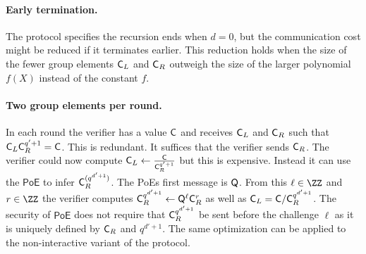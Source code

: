 \documentclass{article}
\theoremstyle{definition}
\newcommand{\benedikt}[1]{{\textcolor{red}{[Benedikt: #1]}}}
\newcommand{\benedikt}[1]{}
\begin{document}

\paragraph{Early termination.} The protocol specifies the recursion ends when $d=0$, but the communication cost might be reduced if it terminates earlier. This reduction holds when the size of the fewer group elements $\mathsf{C}_L$ and $\mathsf{C}_R$ outweigh the size of the larger polynomial $f(X)$ instead of the constant $f$.


%
\paragraph{Two group elements per round.} In each round the verifier has a value $\mathsf{C}$ and receives $\mathsf{C}_L$ and $\mathsf{C}_R$ such that $\mathsf{C}_L\mathsf{C}_R^{q'+1}=\mathsf{C}$. This is redundant. It suffices that the verifier sends $\mathsf{C}_R$. The verifier could now compute $\mathsf{C}_L\gets \frac{\mathsf{C}}{\mathsf{C}_R^{q'+1}}$ but this is expensive. Instead it can use the $\textsf{PoE}$ to infer $\mathsf{C}_R^{(q^{d'+1})}$. The \textsf{PoE}s first message is $\mathsf{Q}$. From this $\ell\in \ZZ$ and $r \in \ZZ$ the verifier computes $\mathsf{C}_R^{q^{d'+1}}\gets \mathsf{Q}^{\ell} \mathsf{C}_R^{r}$ as well as $\mathsf{C}_L=\mathsf{C}/\mathsf{C}_R^{q^{d'+1}}$. The security of $\textsf{PoE}$ does not require that $\mathsf{C}_R^{q^{d'+1}}$ be sent before the challenge $\ell$ as it is uniquely defined by $\mathsf{C}_R$ and $q^{d'+1}$.
The same optimization can be applied to the non-interactive variant of the protocol. 
\end{document}
